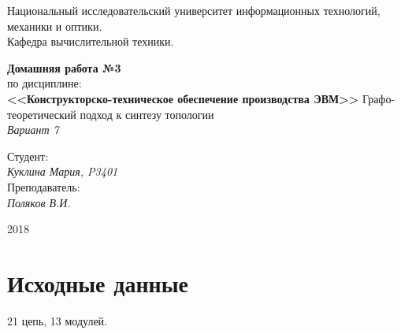 \documentclass[12pt, a4paper] {ncc}
\begin{document}
\setcounter{figure}{0}
\frenchspacing
\pagestyle{empty}
\begin{center}
     Национальный исследовательский университет информационных технологий,
                              механики и оптики.\\
                       Кафедра вычислительной техники.\\
\end{center}
\begin{center}
                         {\bf Домашняя работа №3}\\
							по дисциплине: \\
            {\bf <<Конструкторско-техническое обеспечение производства ЭВМ>>}
                Графо-теоретический подход к синтезу топологии\\
                              {\sl Вариант 7}
\end{center}
\begin{flushright}
														 Студент:\\
                                                         {\it Куклина Мария, P3401}\\
														 Преподаватель:\\
														 {\it Поляков В.И.}\\
\end{flushright}
\begin{center}
                                      2018
\end{center}
\newpage
\pagestyle{plain}

\section{Исходные данные}

21 цепь, 13 модулей. 
\end{document}
